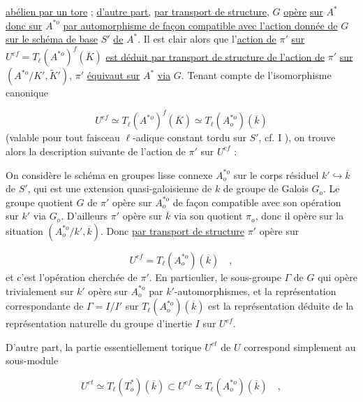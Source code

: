 \underline{abélien par un tore} ; \underline{d'autre part,} \underline{par transport de structure}, $G$ \underline{opère} \underline{sur} $A^*$ \underline{donc sur} $A^{*o}$ \underline{par automorphisme de façon compatible avec l'action donnée de} $G$ \underline{sur le schéma de base} $S'$ \underline{de} $A^*$. Il est clair alors que l'\underline{action de} $\pi'$ \underline{sur} $U^{ef} = T_{\ell}(A^{*o})^{f}(\overline{K})$ \underline{est déduit par transport de structure de l'action de} $\pi'$ \underline{sur} $(A^{*o}/K',\widetilde{K}')$, $\pi'$ \underline{équivaut sur} $A^*$ \underline{via} $G$. Tenant compte de l'isomorphisme canonique

\begin{equation}\tag{4.2.6}
U^{ef} \simeq T_{\ell}(A^{*o})^{f}(\overline{K}) \simeq T_{\ell}(A^{*o}_{o})(\overline{k})
\end{equation}
(valable pour tout faisceau $\ell$-adique constant tordu sur $S'$, cf. I \hspace{2.5em}), on trouve alors la description suivante de l'action de $\pi'$ sur $U^{ef}$ :

On considère le schéma en groupes lisse connexe $A^{*o}_{o}$ sur le corps résiduel $k' \hookrightarrow \overline{k}$ de $S'$, qui est une extension quasi-galoisienne de $k$ de groupe de Galois $G_{o}$. Le groupe quotient $G$ de $\pi'$ opère sur $A^{*o}_{o}$ de façon compatible avec son opération sur $k'$ via $G_{o}$. D'ailleurs $\pi'$ opère sur $\overline{k}$ via son quotient $\pi_{o}$, donc il opère sur la situation $(A^{*o}_{o}/k',\overline{k})$. Donc \underline{par transport de structure} $\pi'$ opère sur

\begin{equation*}
U^{ef} = T_{\ell}(A^{*o}_{o})(\overline{k}) \quad ,
\end{equation*}
et c'est l'opération cherchée de $\pi'$. En particulier, le sous-groupe $\Gamma$ de $G$ qui opère trivialement sur $k'$ opère sur $A^{*o}_{o}$ par $k'$-automorphismes, et la représentation correspondante de $\Gamma = I/I'$ sur $T_{\ell}(A^{*o}_{o})(\overline{k})$ est la représentation déduite de la représentation naturelle du groupe d'inertie $I$ sur $U^{ef}$.

D'autre part, la partie essentiellement torique $U^{et}$ de $U$ correspond simplement au sous-module

\begin{equation}\tag{4.2.7}
U^{et} \simeq T_{\ell}(T^{*}_{o})(\overline{k}) \subset U^{ef} \simeq T_{\ell}(A^{*o}_{o})(\overline{k}) \quad ,
\end{equation}

